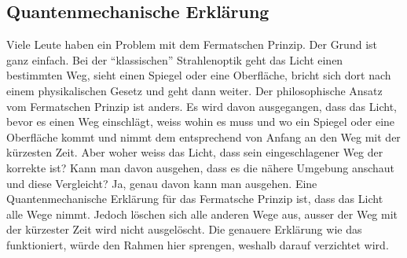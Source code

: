 \subsection{Quantenmechanische Erklärung}
Viele Leute haben ein Problem mit dem Fermatschen Prinzip. 
Der Grund ist ganz einfach. 
Bei der ``klassischen'' Strahlenoptik geht das Licht einen bestimmten Weg, 
sieht einen Spiegel oder eine Oberfläche, bricht sich dort nach einem 
physikalischen Gesetz und geht dann weiter.
Der philosophische Ansatz vom Fermatschen Prinzip ist anders. 
Es wird davon ausgegangen, 
dass das Licht, bevor es einen Weg einschlägt, 
weiss wohin es muss und wo ein Spiegel oder eine Oberfläche kommt und 
nimmt dem entsprechend von Anfang an den Weg mit der kürzesten Zeit.
Aber woher weiss das Licht, dass sein eingeschlagener Weg der korrekte ist?
Kann man davon ausgehen, dass es die nähere Umgebung anschaut und diese Vergleicht?
Ja, genau davon kann man ausgehen. 
Eine Quantenmechanische Erklärung für das Fermatsche Prinzip ist, 
dass das Licht alle Wege nimmt. Jedoch löschen sich alle anderen Wege aus, 
ausser der Weg mit der kürzester Zeit wird nicht ausgelöscht.
Die genauere Erklärung wie das funktioniert, würde den Rahmen hier sprengen, 
weshalb darauf verzichtet wird.